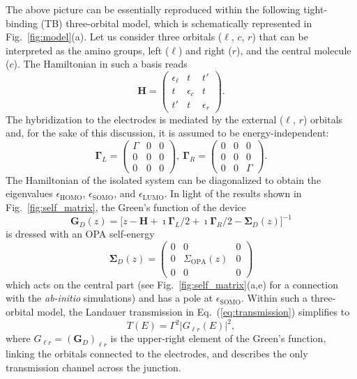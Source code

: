 \documentclass[aps,prx,twocolumn,superscriptaddress]{revtex4-2}
\begin{document}
The above picture can be essentially reproduced within the following tight-binding (TB) three-orbital model, 
which is schematically represented in Fig.~\ref{fig:model}(a).  
Let us consider three orbitals ($\ell$, $c$, $r$) 
that can be interpreted as the amino groups, left ($\ell$) and right ($r$), and the central molecule ($c$). 
The Hamiltonian in such a basis reads
\begin{equation}
    \mathbf{H} = \begin{pmatrix}
     \epsilon_{\ell} & t          & t' \\
     t               & \epsilon_c & t  \\
    t'               & t          & \epsilon_{r}
    \end{pmatrix}.
\end{equation}
The hybridization to the electrodes is mediated by the external ($\ell$, $r$) orbitals and, 
for the sake of this discussion, it is assumed to be energy-independent: 
\begin{equation}
    \mathbf{\Gamma}_L = \begin{pmatrix}
     \Gamma & 0 & 0 \\
     0      & 0 & 0 \\
     0      & 0 & 0
    \end{pmatrix}, \
    \mathbf{\Gamma}_R = \begin{pmatrix}
     0 & 0 & 0 \\
     0 & 0 & 0 \\
     0 & 0 & \Gamma
    \end{pmatrix}.
\end{equation}
The Hamiltonian of the isolated system can be diagonalized to obtain the eigenvalues 
$\epsilon_{\mathrm{HOMO}}$, $\epsilon_{\mathrm{SOMO}}$, and $\epsilon_{\mathrm{LUMO}}$. 
In light of the results shown in Fig.~\ref{fig:self_matrix}, the Green's function of the device 
\begin{equation}
    \mathbf{G}_D(z) = \big[ z - \mathbf{H} + \imath\mathbf{\Gamma}_L/2 + \imath\mathbf{\Gamma}_R/2 -\mathbf{\Sigma}_D(z) \big]^{-1}
\end{equation}
is dressed with an OPA self-energy 
\begin{equation} 
    \mathbf{\Sigma}_D(z) = \begin{pmatrix}
    0 & 0 & 0 \\
    0 & \Sigma_{\mathrm{OPA}}(z) & 0 \\
    0 & 0 & 0
    \end{pmatrix} 
\end{equation}
which acts on the central part (see Fig.~\ref{fig:self_matrix}(a,e) for a connection with the \emph{ab-initio} simulations) 
and has a pole at $\epsilon_{\mathrm{SOMO}}$. 
Within such a three-orbital model, the Landauer transmission in Eq.~(\ref{eq:transmission}) 
simplifies to 
\begin{equation}
    T(E) = \Gamma^2 |G_{\ell r}(E)|^2, 
\end{equation}
where $G_{\ell r}=(\mathbf{G}_D)_{\ell r}$ is the upper-right element of the Green's function, 
linking the orbitals connected to the electrodes, 
and describes the only transmission channel across the junction. 
\end{document}
